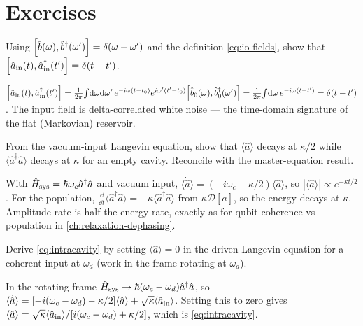 \section*{Exercises}

\begin{exercise}
Using $\comm{\hat b(\omega)}{\hat b^\dagger(\omega')}=\delta(\omega-\omega')$
and the definition \cref{eq:io-fields}, show that
$\comm{\hat a_{\rm in}(t)}{\hat a_{\rm in}^\dagger(t')}=\delta(t-t')$.
\begin{solution}
$\comm{\hat a_{\rm in}(t)}{\hat a_{\rm in}^\dagger(t')}
=\tfrac1{2\pi}\!\int\!\dd\omega\dd\omega'\,e^{-i\omega(t-t_0)}e^{i\omega'(t'-t_0)}
\comm{\hat b_0(\omega)}{\hat b_0^\dagger(\omega')}
=\tfrac1{2\pi}\!\int\!\dd\omega\,e^{-i\omega(t-t')}=\delta(t-t')$.
The input field is delta-correlated white noise --- the time-domain
signature of the flat (Markovian) reservoir.
\end{solution}
\end{exercise}

\begin{exercise}
From the vacuum-input Langevin equation, show that
$\langle\hat a\rangle$ decays at $\kappa/2$ while
$\langle\hat a^\dagger\hat a\rangle$ decays at $\kappa$ for an empty
cavity. Reconcile with the master-equation result.
\begin{solution}
With $\hat{H}_{\rm sys}=\hbar\omega_c\hat a^\dagger\hat a$ and vacuum
input, $\langle\dot{\hat a}\rangle=(-i\omega_c-\kappa/2)\langle\hat a\rangle$,
so $|\langle\hat a\rangle|\propto e^{-\kappa t/2}$. For the
population, $\tfrac{\dd}{\dd t}\langle\hat a^\dagger\hat a\rangle
=-\kappa\langle\hat a^\dagger\hat a\rangle$ from $\kappa\mathcal D[\hat a]$,
so the energy decays at $\kappa$. Amplitude rate is half the energy
rate, exactly as for qubit coherence vs population in
\cref{ch:relaxation-dephasing}.
\end{solution}
\end{exercise}

\begin{exercise}
Derive \cref{eq:intracavity} by setting $\langle\dot{\hat a}\rangle=0$
in the driven Langevin equation for a coherent input at $\omega_d$
(work in the frame rotating at $\omega_d$).
\begin{solution}
In the rotating frame $\hat{H}_{\rm sys}\to\hbar(\omega_c-\omega_d)\hat a^\dagger\hat a$,
so $\langle\dot{\hat a}\rangle=[-i(\omega_c-\omega_d)-\kappa/2]\langle\hat a\rangle+\sqrt\kappa\langle\hat a_{\rm in}\rangle$.
Setting this to zero gives
$\langle\hat a\rangle=\sqrt\kappa\langle\hat a_{\rm in}\rangle/[i(\omega_c-\omega_d)+\kappa/2]$,
which is \cref{eq:intracavity}.
\end{solution}
\end{exercise}

